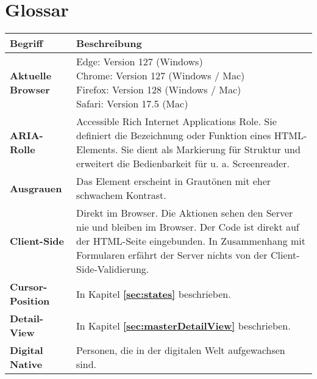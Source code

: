 \chapter*{Glossar}
\label{chap:glossary}

\newcommand{\glossarywithTitle}{0.23\textwidth}
\newcommand{\glossarywith}{0.76\textwidth}

\begin{table}[!ht]
    \centering
    \footnotesize
    \begin{adjustbox}{max width=\textwidth}
        \begin{tabular}{ p{\glossarywithTitle} | p{\glossarywith} }
            \bf{Begriff} & \bf{Beschreibung} \\
            \hline \hline
            \bf{Aktuelle Browser} & \tbbr{
                Edge: Version 127 (Windows) \\
                Chrome: Version 127 (Windows / Mac) \\
                Firefox: Version 128 (Windows / Mac) \\
                Safari: Version 17.5 (Mac)
            } \\
            \hline
            \bf{ARIA-Rolle} & Accessible Rich Internet Applications Role.
                Sie definiert die Bezeichnung oder Funktion eines HTML-Elements.
                Sie dient als Markierung für Struktur und erweitert die Bedienbarkeit für u. a. Screenreader. \\
            \hline
            \bf{Ausgrauen} & Das Element erscheint in Grautönen mit eher schwachem Kontrast. \\
            \hline
            \bf{Client-Side} & Direkt im Browser. 
                Die Aktionen sehen den Server nie und bleiben im Browser. 
                Der Code ist direkt auf der HTML-Seite eingebunden. 
                In Zusammenhang mit Formularen erfährt der Server nichts von der Client-Side-Validierung. \\
            \hline
            \bf{Cursor-Position} & In Kapitel \textbf{\ref{sec:states} \nameref{sec:states}} beschrieben. \\
            \hline
            \bf{Detail-View} & In Kapitel \textbf{\ref{sec:masterDetailView} \nameref{sec:masterDetailView}} beschrieben. \\
            \hline
            \raggedright \bf{Digital Native} & Personen, die in der digitalen Welt aufgewachsen sind. 

\end{tabular}
\end{adjustbox}
\end{table}

